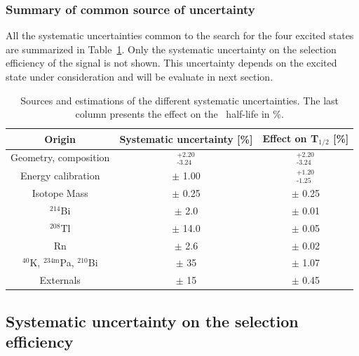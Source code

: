 \documentclass[main.tex]{subfiles}
\begin{document}
\FloatBarrier


\subsubsection{Summary of common source of uncertainty}


\NI All the systematic uncertainties common to the search for the four excited states are summarized in Table~\ref{Table:SystCurrent}. Only the systematic uncertainty on the selection efficiency of the signal is not shown. This uncertainty depends on the excited state under consideration and will be evaluate in next section.


\begin{table}
\centering
\begin{tabular}{c|c|c}
Origin                                   & Systematic uncertainty [\%] & Effect on T$_{\text{1/2}}$ [\%] \\[0.1cm]
\toprule
Geometry, composition                    & $^{\text{+2.20}}_{\text{-3.24}}$ & $^{\text{+2.20}}_{\text{-3.24}}$ \\[0.1cm]
\hline
Energy calibration                       & $\pm$ 1.00                       & $^{\text{+1.20}}_{\text{-1.25}}$ \\[0.1cm]
\hline
Isotope Mass                             & $\pm$ 0.25                       & $\pm$ 0.25 \\[0.1cm]
\hline
$^{\text{214}}$Bi                        & $\pm$ 2.0                        & $\pm$ 0.01 \\[0.1cm]
\hline
$^{\text{208}}$Tl                        & $\pm$ 14.0                       & $\pm$ 0.05 \\[0.1cm]
\hline
Rn                                       & $\pm$ 2.6                        & $\pm$ 0.02 \\[0.1cm]
\hline
$^{\text{40}}$K, $^{\text{234m}}$Pa, $^{\text{210}}$Bi & $\pm$ 35           & $\pm$ 1.07 \\[0.1cm]
\hline
Externals                                & $\pm$ 15                         & $\pm$ 0.45 \\[0.1cm]
\bottomrule
\end{tabular}
\caption{Sources and estimations of the different systematic uncertainties. The last column presents the effect on the \Cd~half-life in \%.}
\label{Table:SystCurrent}
\end{table}


\FloatBarrier


\subsection{Systematic uncertainty on the selection efficiency}\label{sec:SystematicsEvaluationEff}
\end{document}
